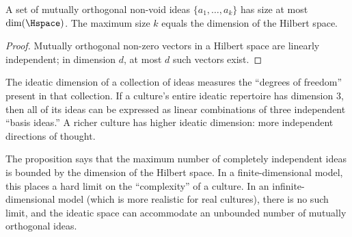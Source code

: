\begin{proposition}
\label{prop:max-orthogonal}
A set of mutually orthogonal non-void ideas $\{a_1, \ldots, a_k\}$ has size
at most $\dim(\Hspace)$.  The maximum size $k$ equals the dimension of the
Hilbert space.
\end{proposition}

\begin{proof}
Mutually orthogonal non-zero vectors in a Hilbert space are linearly
independent; in dimension $d$, at most $d$ such vectors exist.
\end{proof}

\begin{interpretation}
The ideatic dimension of a collection of ideas measures the ``degrees of
freedom'' present in that collection.  If a culture's entire ideatic
repertoire has dimension 3, then all of its ideas can be expressed as
linear combinations of three independent ``basis ideas.''  A richer
culture has higher ideatic dimension: more independent directions of thought.

The proposition says that the maximum number of completely independent ideas
is bounded by the dimension of the Hilbert space.  In a finite-dimensional
model, this places a hard limit on the ``complexity'' of a culture.  In an
infinite-dimensional model (which is more realistic for real cultures), there
is no such limit, and the ideatic space can accommodate an unbounded number
of mutually orthogonal ideas.
\end{interpretation}

